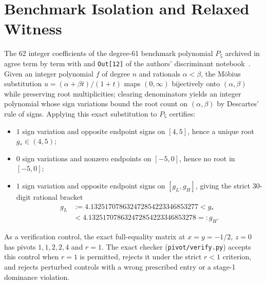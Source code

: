 \documentclass[11pt]{article}
\theoremstyle{remark}
\begin{document}
\section{Benchmark Isolation and Relaxed Witness}\label{sec:benchmark}

The 62 integer coefficients of the degree-61 benchmark polynomial $P_5$
archived in  agree term by term with
\cite[eq.~(2.15)]{CEU2026} and \texttt{Out[12]} of the authors' discriminant
notebook~\cite{CEUCode}. Given an integer polynomial $f$ of degree $n$ and
rationals $\alpha < \beta$, the M\"obius substitution
$u = (\alpha + \beta t)/(1+t)$ maps $(0,\infty)$ bijectively onto
$(\alpha,\beta)$ while preserving root multiplicities; clearing denominators
yields an integer polynomial whose sign variations bound the root count on
$(\alpha,\beta)$ by Descartes' rule of signs. Applying this exact substitution
to $P_5$ certifies:
\begin{itemize}
  \item $1$ sign variation and opposite endpoint signs on $[4,5]$, hence a
  unique root $g_*\in(4,5)$;
  \item $0$ sign variations and nonzero endpoints on $[-5,0]$, hence no root
  in $[-5,0]$;
  \item $1$ sign variation and opposite endpoint signs on $[g_L,g_H]$, giving
  the strict 30-digit rational bracket
  \begin{equation}\label{eq:gstar-bracket}
  \begin{aligned}
    g_L &:= 4.132517078632472854223346853277 < g_* \\
        &< 4.132517078632472854223346853278 =: g_H.
  \end{aligned}
  \end{equation}
\end{itemize}

As a verification control, the exact full-equality matrix at
$x=y=-1/2$, $z=0$ has pivots $1,1,2,2,4$ and $r=1$. The exact checker
(\texttt{pivot/verify.py}) accepts this control when $r=1$ is permitted,
rejects it under the strict $r<1$ criterion, and rejects perturbed controls
with a wrong prescribed entry or a stage-1 dominance violation.
\end{document}
